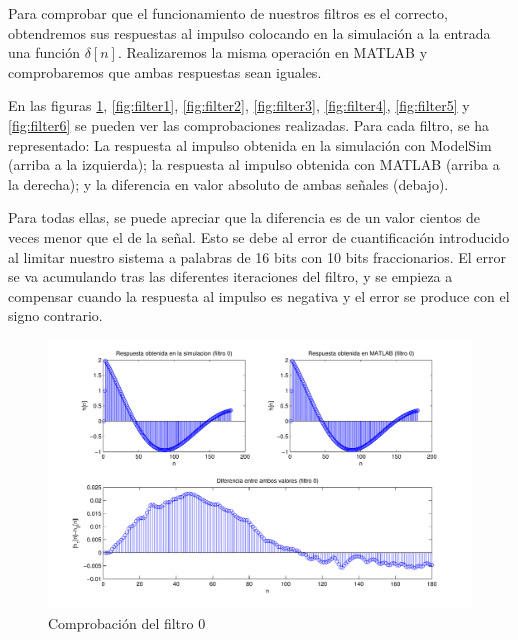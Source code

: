 \documentclass[a4paper,12pt]{report}
\begin{document}
Para comprobar que el funcionamiento de nuestros filtros es el correcto, obtendremos sus respuestas al impulso colocando en la simulación a la entrada una función $\delta[n]$. Realizaremos la misma operación en MATLAB y comprobaremos que ambas respuestas sean iguales.

En las figuras \ref{fig:filter0}, \ref{fig:filter1}, \ref{fig:filter2}, \ref{fig:filter3}, \ref{fig:filter4}, \ref{fig:filter5} y \ref{fig:filter6} se pueden ver las comprobaciones realizadas. Para cada filtro, se ha representado: La respuesta al impulso obtenida en la simulación con ModelSim (arriba a la izquierda); la respuesta al impulso obtenida con MATLAB (arriba a la derecha); y la diferencia en valor absoluto de ambas señales (debajo).

Para todas ellas, se puede apreciar que la diferencia es de un valor cientos de veces menor que el de la señal. Esto se debe al error de cuantificación introducido al limitar nuestro sistema a palabras de 16 bits con 10 bits fraccionarios. El error se va acumulando tras las diferentes iteraciones del filtro, y se empieza a compensar cuando la respuesta al impulso es negativa y el error se produce con el signo contrario. 

\begin{figure}[hbt]
\includegraphics[width=\textwidth]{img/respfiltro0.pdf} 
\caption{Comprobación del filtro 0} \label{fig:filter0}
\end{figure}
\end{document}
